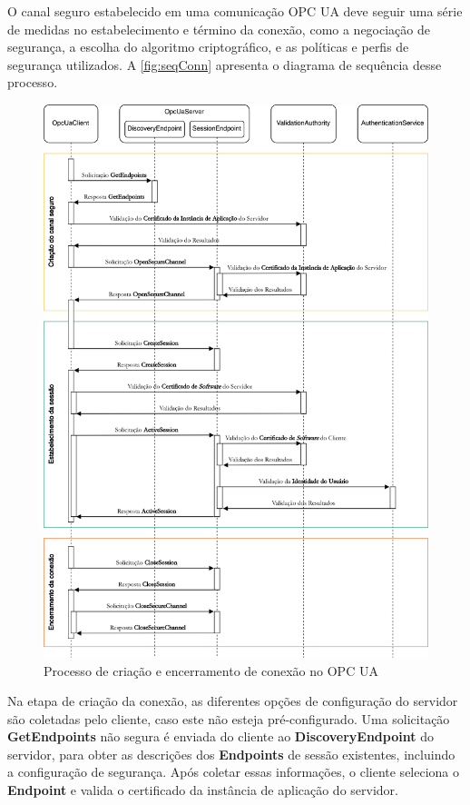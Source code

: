         O canal seguro estabelecido em uma comunicação OPC UA deve seguir uma série de medidas no estabelecimento e término da conexão, como a negociação de segurança, a escolha do algoritmo criptográfico, e as políticas e perfis de segurança utilizados. A \autoref{fig:seqConn} apresenta o diagrama de sequência desse processo.

        \begin{figure}[htbp]
            \caption{Processo de criação e encerramento de conexão no OPC UA}
            \label{fig:seqConn}
            \begin{center}
                \includegraphics[width=0.972\linewidth]{USPSC-img/seqConn.png}
            \end{center}
        \end{figure}

        Na etapa de criação da conexão, as diferentes opções de configuração do servidor são coletadas pelo cliente, caso este não esteja pré-configurado. Uma solicitação \textbf{GetEndpoints} não segura é enviada do cliente ao \textbf{DiscoveryEndpoint} do servidor, para obter as descrições dos \textbf{Endpoints} de sessão existentes, incluindo a configuração de segurança. Após coletar essas informações, o cliente seleciona o \textbf{Endpoint} e valida o certificado da instância de aplicação do servidor.
    
